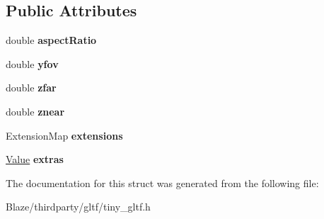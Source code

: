 \subsection*{Public Attributes}
\begin{DoxyCompactItemize}
\item 
\mbox{\label{structtinygltf_1_1PerspectiveCamera_af49871cd220ee6d9b7d5ccb9e28eaff2}} 
double {\bfseries aspect\+Ratio}
\item 
\mbox{\label{structtinygltf_1_1PerspectiveCamera_abdddae882d324eed15e82dd9adedc341}} 
double {\bfseries yfov}
\item 
\mbox{\label{structtinygltf_1_1PerspectiveCamera_a7189b794f751ae6425dba271f1695688}} 
double {\bfseries zfar}
\item 
\mbox{\label{structtinygltf_1_1PerspectiveCamera_aa98faf2c01a19f4d7227dd6ac35581d6}} 
double {\bfseries znear}
\item 
\mbox{\label{structtinygltf_1_1PerspectiveCamera_a5c7c5a7858aed2e666b7dfad1e55c78e}} 
Extension\+Map {\bfseries extensions}
\item 
\mbox{\label{structtinygltf_1_1PerspectiveCamera_ad6dadf04d254d43b527a59f1c5361908}} 
\hyperlink{classtinygltf_1_1Value}{Value} {\bfseries extras}
\end{DoxyCompactItemize}


The documentation for this struct was generated from the following file\+:\begin{DoxyCompactItemize}
\item 
Blaze/thirdparty/gltf/tiny\+\_\+gltf.\+h\end{DoxyCompactItemize}
